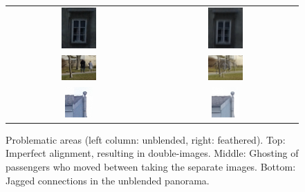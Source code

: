 \begin{figure}[h]
	\centering
	\begin{tabular}{cc}
	\includegraphics[width=0.25\textwidth]{figures/window_unblended.png} &
	\includegraphics[width=0.25\textwidth]{figures/window_feathered.png} \\
	\includegraphics[width=0.25\textwidth]{figures/ghosts_unblended.png} &
	\includegraphics[width=0.25\textwidth]{figures/ghosts_feathered.png} \\
	\includegraphics[width=0.20\textwidth]{figures/jagged_unblended.png} &
	\includegraphics[width=0.20\textwidth]{figures/jagged_feathered.png} \\

	\end{tabular}
	\caption{Problematic areas (left column: unblended, right: feathered). Top: Imperfect alignment, resulting in double-images. Middle: Ghosting of passengers who moved between taking the separate images. Bottom: Jagged connections in the unblended panorama. }
	\label{fig:a4:problems}
\end{figure}
